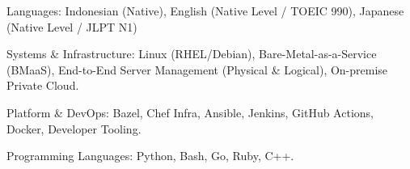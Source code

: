 

\begin{cvparagraph}

\begin{cvbullets}
    \item Languages: Indonesian (Native), English (Native Level / TOEIC 990), Japanese (Native Level / JLPT N1)
    \item Systems \& Infrastructure: Linux (RHEL/Debian), Bare-Metal-as-a-Service (BMaaS),
    End-to-End Server Management (Physical \& Logical), On-premise Private Cloud.
    \item Platform \& DevOps: Bazel, Chef Infra, Ansible, Jenkins, GitHub Actions, Docker, Developer Tooling.
    \item Programming Languages: Python, Bash, Go, Ruby, C++.
\end{cvbullets}
\end{cvparagraph}
